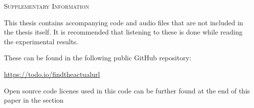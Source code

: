 \begin{center}
    \textsc{Supplementary Information}
\end{center}

This thesis contains accompanying code and audio files that are not included in the thesis itself. It is recommended that listening to these is done while reading the experimental results.

These can be found in the following public GitHub repository:

\href{https://todo.io/findtheactualurl}{https://todo.io/findtheactualurl}

Open source code licenes used in this code can be further found at the end of this paper in the section 
